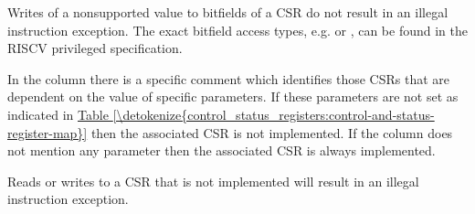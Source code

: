 \documentclass[letterpaper,10pt,english]{sphinxmanual}
\begin{document}
\sphinxAtStartPar
Writes of a non\sphinxhyphen{}supported value to  bitfields of a  CSR do not result in an illegal
instruction exception. The exact bitfield access types, e.g.  or , can be found in the RISC\sphinxhyphen{}V
privileged specification.

\sphinxAtStartPar
In the  column there is a specific comment which identifies those CSRs that are dependent on the value
of specific parameters. If these parameters are not set as
indicated in \hyperref[\detokenize{control_status_registers:control-and-status-register-map}]{Table \ref{\detokenize{control_status_registers:control-and-status-register-map}}} then the associated CSR is not implemented. If the column does not
mention any parameter then the associated CSR is always implemented.

\sphinxAtStartPar
Reads or writes to a CSR that is not implemented will result in an illegal
instruction exception.
\end{document}
